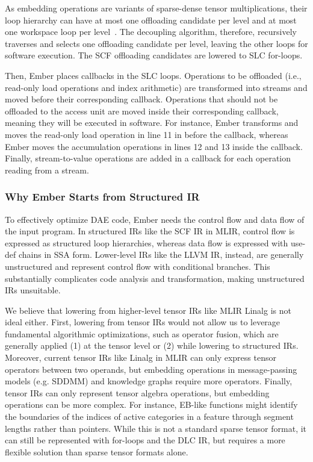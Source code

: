 

As embedding operations are variants of sparse-dense tensor multiplications, their loop hierarchy can have at most one offloading candidate per level and at most one workspace loop per level~\cite{kjolstad2017oopsla,kjolstad2019cgo}. The decoupling algorithm, therefore, recursively traverses and selects one offloading candidate per level, leaving the other loops for software execution. The SCF offloading candidates are lowered to SLC for-loops.

Then, Ember places callbacks in the SLC loops. Operations to be offloaded (i.e., read-only load operations and index arithmetic) are transformed into streams and moved before their corresponding callback. Operations that should not be offloaded to the access unit are moved inside their corresponding callback, meaning they will be executed in software. For instance, Ember transforms and moves the read-only load operation in line 11 in  before the callback, whereas Ember moves the accumulation operations in lines 12 and 13 inside the callback. Finally, stream-to-value operations are added in a callback for each operation reading from a stream.

\subsubsection{Why Ember Starts from Structured IR} \label{sec:ember-structured-ir} %

To effectively optimize DAE code, Ember needs the control flow and data flow of the input program. In structured IRs like the SCF IR in MLIR, control flow is expressed as structured loop hierarchies, whereas data flow is expressed with use-def chains in SSA form. Lower-level IRs like the LLVM IR, instead, are generally unstructured and represent control flow with conditional branches. This substantially complicates code analysis and transformation, making unstructured IRs unsuitable.

We believe that lowering from higher-level tensor IRs like MLIR Linalg is not ideal either. First, lowering from tensor IRs would not allow us to leverage fundamental algorithmic optimizations, such as operator fusion, which are generally applied (1) at the tensor level or (2) while lowering to structured IRs. Moreover, current tensor IRs like Linalg in MLIR can only express tensor operators between two operands, but embedding operations in message-passing models (e.g. SDDMM) and knowledge graphs require more operators. Finally, tensor IRs can only represent tensor algebra operations, but embedding operations can be more complex. For instance, EB-like functions might identify the boundaries of the indices of active categories in a feature through segment lengths rather than pointers. While this is not a standard sparse tensor format, it can still be represented with for-loops and the DLC IR, but requires a more flexible solution than sparse tensor formats alone.

